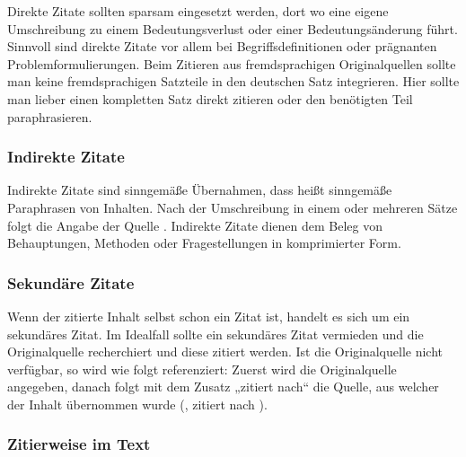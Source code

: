Direkte Zitate sollten sparsam eingesetzt werden, dort wo eine eigene Umschreibung zu einem Bedeutungsverlust oder einer Bedeutungsänderung führt. Sinnvoll sind direkte Zitate vor allem bei Begriffsdefinitionen oder prägnanten Problemformulierungen. Beim Zitieren aus fremdsprachigen Originalquellen sollte man keine fremdsprachigen Satzteile  in den deutschen Satz integrieren. Hier sollte man lieber einen kompletten Satz direkt zitieren oder den benötigten Teil paraphrasieren.

\subsubsection{Indirekte Zitate}\label{subsubsec:indirekte}

Indirekte Zitate sind sinngemäße Übernahmen, dass heißt sinngemäße Paraphrasen von Inhalten. Nach der Umschreibung in einem oder mehreren Sätze folgt die Angabe der Quelle \cite[11]{mustermann2013test}. Indirekte Zitate dienen dem Beleg von Behauptungen, Methoden oder Fragestellungen in komprimierter Form.

\subsubsection{Sekundäre Zitate}\label{subsubsec:sekundäre}

Wenn der zitierte Inhalt selbst schon ein Zitat ist, handelt es sich um ein sekundäres Zitat. Im Idealfall sollte ein sekundäres Zitat vermieden und die Originalquelle recherchiert und diese zitiert werden. Ist die Originalquelle nicht verfügbar, so wird wie folgt referenziert: Zuerst wird die Originalquelle angegeben, danach folgt mit dem Zusatz „zitiert nach“ die Quelle, aus welcher der Inhalt übernommen wurde (\citealp[S.11]{mustermann2013test}, zitiert nach \citealp[S.11]{huber2013buch}).

\subsubsection{Zitierweise im Text}\label{subsubsec:zitierweise}

